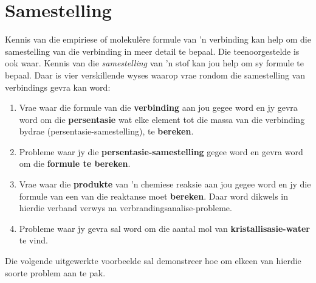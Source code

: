          \section{Samestelling}
    \nopagebreak
      \label{m38712*id280450}Kennis van die empiriese of molekul\^{e}re formule van 'n verbinding kan help om die samestelling van die verbinding in meer detail te bepaal. Die teenoorgestelde is ook waar. Kennis van die \textsl{samestelling} van 'n stof kan jou help om sy formule te bepaal. Daar is vier verskillende wyses waarop vrae rondom die samestelling van verbindings gevra kan word:
      \label{m38712*id280463}\begin{enumerate}[noitemsep, label=\textbf{\arabic*}. ] 
\item Vrae waar die formule van die \textbf{verbinding} aan jou gegee word en jy gevra word om die \textbf{persentasie} wat elke element tot die massa van die verbinding bydrae (persentasie-samestelling), te \textbf{bereken}.
\item Probleme waar jy die \textbf{persentasie-samestelling} gegee word en gevra word om die \textbf{formule te bereken}.
\item Vrae waar die \textbf{produkte} van  'n chemiese reaksie aan jou gegee word en jy die formule van een van die reaktanse moet \textbf{bereken}. Daar word dikwels in hierdie verband verwys na verbrandingsanalise-probleme.
\item Probleme waar jy gevra sal word om die aantal mol van \textbf{kristallisasie-water} te vind.
\end{enumerate}
Die volgende uitgewerkte voorbeelde sal demonstreer hoe om  elkeen van hierdie soorte problem aan te pak.
            \label{m38712*secfhsst!!!underscore!!!id901}
      \noindent
{}
